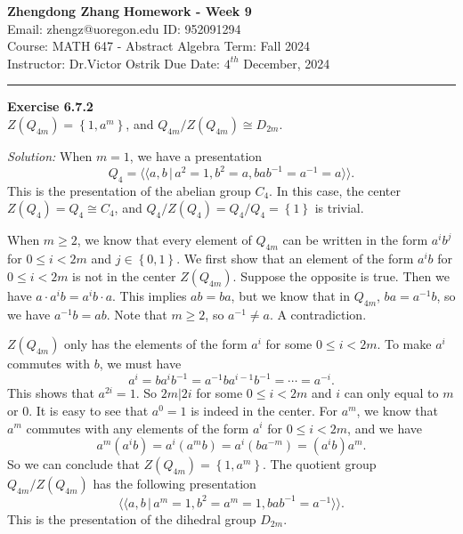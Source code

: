 \documentclass[a4paper, 12pt]{article}
\newenvironment{problem}[2][Exercise]
    { \begin{mdframed}[backgroundcolor=gray!20] \textbf{#1 #2} \\}
    {  \end{mdframed}}
\newenvironment{solution}
    {\textit{Solution:}}
    {}
\newcommand{\la}{\langle}
\newcommand{\ra}{\rangle}
\begin{document}
\noindent
\large\textbf{Zhengdong Zhang} \hfill \textbf{Homework - Week 9}   \\
Email: zhengz@uoregon.edu \hfill ID: 952091294 \\
\normalsize Course: MATH 647 - Abstract Algebra  \hfill Term: Fall 2024\\
Instructor: Dr.Victor Ostrik \hfill Due Date: $4^{th}$ December, 2024 \\
\noindent\rule{7in}{2.8pt}
\begin{problem}{6.7.2}
\(Z(Q_{4m})=\left\{ 1,a^m \right\}\), and \(Q_{4m}/Z(Q_{4m})\cong D_{2m}\).
\end{problem}
\begin{solution}
When \(m=1\), we have a presentation 
\[Q_4=\la\la a,b\,|\, a^2=1, b^2=a, bab^{-1}=a^{-1}=a\ra\ra.\]
This is the presentation of the abelian group \(C_4\). In this case, the center \(Z(Q_4)=Q_4\cong C_4\), and \(Q_4/Z(Q_4)=Q_4/Q_4=\left\{ 1 \right\}\) is trivial. 

When \(m\geq 2\), we know that every element of \(Q_{4m}\) can be written in the form \(a^ib^j\) for \(0\leq i<2m\) and \(j\in \left\{ 0,1 \right\}\). We first show that an element of the 
form \(a^ib\) for \(0\leq i<2m\) is not in the center \(Z(Q_{4m})\). Suppose the opposite is true. Then we have \(a\cdot a^ib=a^ib\cdot a\). This implies \(ab=ba\), but we know that in \(Q_{4m}\), \(ba=a^{-1}b\), so 
we have \(a^{-1}b=ab\). Note that \(m\geq 2\), so \(a^{-1}\neq a\). A contradiction. 

\(Z(Q_{4m})\) only has the elements of the form \(a^i\) for some \(0\leq i<2m\). To make \(a^i\) commutes with \(b\), we must have 
\[a^i=ba^ib^{-1}=a^{-1}ba^{i-1}b^{-1}=\cdots=a^{-i}.\]
This shows that \(a^{2i}=1\). So \(2m|2i\) for some \(0\leq i<2m\) and \(i\) can only equal to \(m\) or \(0\). It is easy to see that \(a^0=1\) is indeed in the center. For \(a^m\), we know that \(a^m\) commutes with any 
elements of the form \(a^i\) for \(0\leq i<2m\), and we have 
\[a^m(a^ib)=a^i(a^mb)=a^i(ba^{-m})=(a^ib)a^m.\]
So we can conclude that \(Z(Q_{4m})=\left\{ 1,a^m \right\}\). The quotient group \(Q_{4m}/Z(Q_{4m})\) has the following presentation 
\[\la\la a,b\, |\, a^m=1,b^2=a^m=1,bab^{-1}=a^{-1}\ra\ra.\]
This is the presentation of the dihedral group \(D_{2m}\).
\end{solution}
\end{document}
